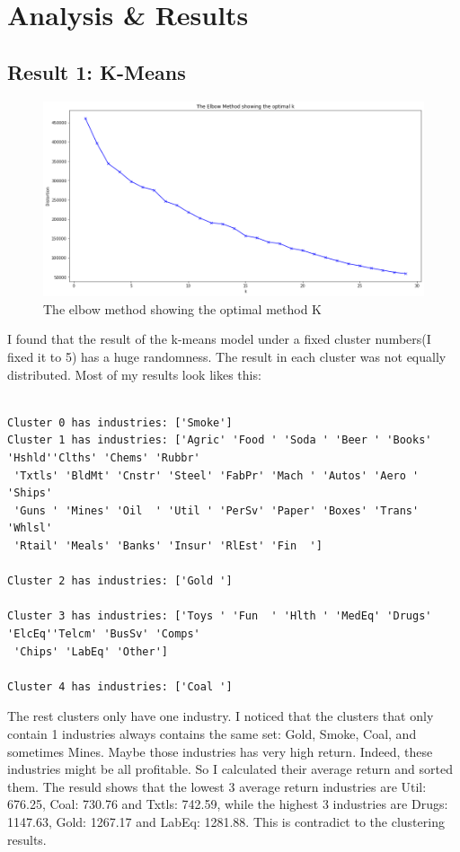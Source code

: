 \documentclass[11pt]{report}
\begin{document}
\section{Analysis \& Results}

\subsection{Result 1: K-Means}

\begin{figure}[h]
     \centering
     \includegraphics[width = \linewidth]{elbow.png}
     \caption{The elbow method showing the optimal method K}\label{fig:elbow}
\end{figure}

I found that the result of the k-means model under a fixed cluster numbers(I fixed it to 5) has a huge randomness. The result in each cluster was not equally distributed. Most of my results look likes this:

\begin{lstlisting}

Cluster 0 has industries: ['Smoke'] 
Cluster 1 has industries: ['Agric' 'Food ' 'Soda ' 'Beer ' 'Books' 'Hshld''Clths' 'Chems' 'Rubbr'
 'Txtls' 'BldMt' 'Cnstr' 'Steel' 'FabPr' 'Mach ' 'Autos' 'Aero ' 'Ships'
 'Guns ' 'Mines' 'Oil  ' 'Util ' 'PerSv' 'Paper' 'Boxes' 'Trans' 'Whlsl'
 'Rtail' 'Meals' 'Banks' 'Insur' 'RlEst' 'Fin  '] 

Cluster 2 has industries: ['Gold '] 

Cluster 3 has industries: ['Toys ' 'Fun  ' 'Hlth ' 'MedEq' 'Drugs' 'ElcEq''Telcm' 'BusSv' 'Comps'
 'Chips' 'LabEq' 'Other'] 

Cluster 4 has industries: ['Coal '] 

\end{lstlisting}

The rest clusters only have one industry. I noticed that the clusters that only contain 1 industries always contains the same set: Gold, Smoke, Coal, and sometimes Mines. Maybe those industries has very high return. Indeed, these industries might be all profitable. So I calculated their average return and sorted them. The resuld shows that the lowest 3 average return industries are Util: 676.25, Coal: 730.76 and Txtls: 742.59, while the highest 3 industries are Drugs: 1147.63, Gold: 1267.17 and LabEq: 1281.88. This is contradict to the clustering results.
\end{document}
